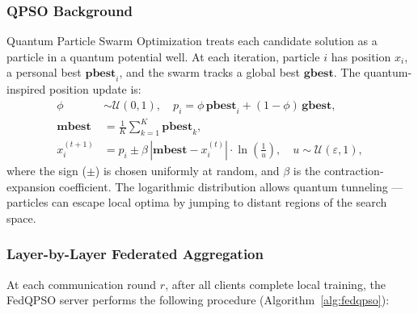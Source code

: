 \documentclass[conference]{IEEEtran}
\begin{document}
\subsubsection{QPSO Background}
Quantum Particle Swarm Optimization \cite{sun2004qpso} treats each candidate
solution as a particle in a quantum potential well. At each iteration,
particle $i$ has position $x_i$, a personal best $\mathbf{pbest}_i$, and the
swarm tracks a global best $\mathbf{gbest}$. The quantum-inspired position
update is:
\begin{align}
    \phi &\sim \mathcal{U}(0,1), \quad
    p_i = \phi\,\mathbf{pbest}_i + (1-\phi)\,\mathbf{gbest},
    \label{eq:attractor}\\
    \mathbf{mbest} &= \frac{1}{K}\sum_{k=1}^{K}\mathbf{pbest}_k,
    \label{eq:mbest}\\
    x_i^{(t+1)} &= p_i \pm \beta\,|{\mathbf{mbest}} - x_i^{(t)}|
    \cdot \ln\!\left(\frac{1}{u}\right), \quad u \sim \mathcal{U}(\varepsilon,1),
    \label{eq:qpso_update}
\end{align}
where the sign ($\pm$) is chosen uniformly at random, and $\beta$ is the
contraction-expansion coefficient. The logarithmic distribution allows quantum
tunneling --- particles can escape local optima by jumping to distant regions
of the search space.

\subsubsection{Layer-by-Layer Federated Aggregation}
At each communication round $r$, after all clients complete local training, the
FedQPSO server performs the following procedure (Algorithm~\ref{alg:fedqpso}):
\end{document}
